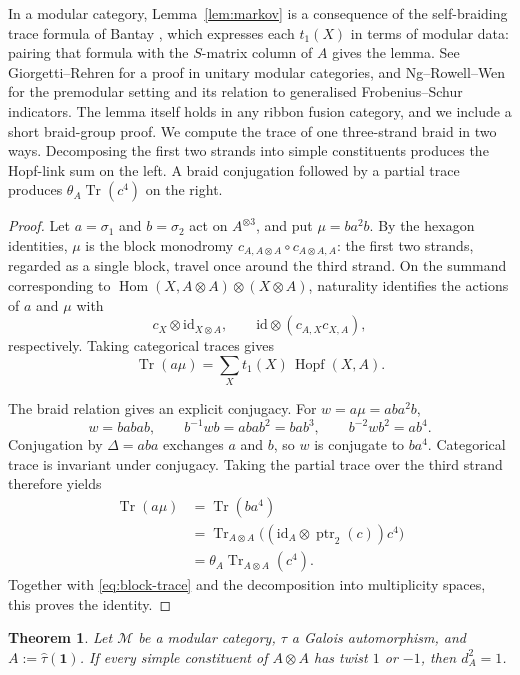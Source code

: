 \documentclass[11pt,oneside]{amsart}
\newtheorem{theorem}{Theorem}[section]
\theoremstyle{remark}
\newcommand{\M}{\mathcal M}
\newcommand{\one}{\mathbf 1}
\newcommand{\Tr}{\operatorname{Tr}}
\newcommand{\ptr}{\operatorname{ptr}}
\newcommand{\Hom}{\operatorname{Hom}}
\newcommand{\Hopf}{\operatorname{Hopf}}
\newcommand{\htau}{\hat\tau}
\begin{document}
In a modular category, Lemma~\ref{lem:markov} is a consequence of the
self-braiding trace formula of Bantay \cite{Ban}, which expresses each $t_1(X)$
in terms of modular data: pairing that formula with the $S$-matrix column of
$A$ gives the lemma. See Giorgetti--Rehren \cite[Proposition~2.3 of the arXiv version]{GR} for a
proof in unitary modular categories, and Ng--Rowell--Wen \cite[Theorem~3]{NRW}
for the premodular setting and its relation to generalised Frobenius--Schur
indicators. The lemma itself holds in any ribbon fusion category, and we
include a short braid-group proof. We compute the trace of one three-strand braid
in two ways. Decomposing the
first two strands into simple constituents produces the Hopf-link sum on the
left. A braid conjugation followed by a partial trace produces
$\theta_A\Tr(c^4)$ on the right.

\begin{proof}
Let $a=\sigma_1$ and $b=\sigma_2$ act on $A^{\otimes3}$, and put
$\mu=ba^2b$. By the hexagon identities, $\mu$ is the block monodromy
$c_{A,A\otimes A}\circ c_{A\otimes A,A}$: the first two strands, regarded as a
single block, travel once around the third strand. On the summand
corresponding to $\Hom(X,A\otimes A)\otimes(X\otimes A)$, naturality
identifies the actions of $a$ and $\mu$ with
\[
c_X\otimes\mathrm{id}_{X\otimes A},
\qquad
\mathrm{id}\otimes(c_{A,X}c_{X,A}),
\]
respectively. Taking categorical traces gives
\begin{equation}\label{eq:block-trace}
\Tr(a\mu)=\sum_Xt_1(X)\,\Hopf(X,A).
\end{equation}

The braid relation gives an explicit conjugacy. For $w=a\mu=aba^2b$,
\[
w=babab,\qquad
b^{-1}wb=abab^2=bab^3,\qquad
b^{-2}wb^2=ab^4.
\]
Conjugation by $\Delta=aba$ exchanges $a$ and $b$, so $w$ is conjugate to
$ba^4$. Categorical trace is invariant under conjugacy. Taking the partial
trace over the third strand therefore yields
\[
\begin{aligned}
\Tr(a\mu)&=\Tr(ba^4)\\
&=\Tr_{A\otimes A}\bigl((\mathrm{id}_A\otimes\ptr_2(c))c^4\bigr)\\
&=\theta_A\Tr_{A\otimes A}(c^4).
\end{aligned}
\]
Together with \eqref{eq:block-trace} and the decomposition into multiplicity
spaces, this proves the identity.
\end{proof}

\begin{theorem}\label{thm:QO}
Let $\M$ be a modular category, $\tau$ a Galois automorphism, and
$A:=\htau(\one)$. If every simple constituent of $A\otimes A$ has twist $1$ or
$-1$, then $d_A^2=1$.
\end{theorem}
\end{document}
